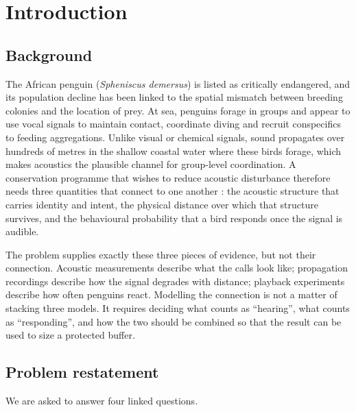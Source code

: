 \section{Introduction}

\subsection{Background}

The African penguin (\textit{Spheniscus demersus}) is listed as critically endangered, and its
population decline has been linked to the spatial mismatch between breeding colonies and the
location of prey. At sea, penguins forage in groups and appear to use vocal signals to maintain
contact, coordinate diving and recruit conspecifics to feeding aggregations. Unlike visual or
chemical signals, sound propagates over hundreds of metres in the shallow coastal water where
these birds forage, which makes acoustics the plausible channel for group-level coordination.
A conservation programme that wishes to reduce acoustic disturbance therefore needs three
quantities that connect to one another \cite{ref1,ref2,ref3}: the acoustic structure that carries identity and
intent, the physical distance over which that structure survives, and the behavioural
probability that a bird responds once the signal is audible.

The problem supplies exactly these three pieces of evidence, but not their connection.
Acoustic measurements describe what the calls look like; propagation recordings describe how
the signal degrades with distance; playback experiments describe how often penguins react.
Modelling the connection is not a matter of stacking three models. It requires deciding what
counts as ``hearing'', what counts as ``responding'', and how the two should be combined so
that the result can be used to size a protected buffer.

\subsection{Problem restatement}

We are asked to answer four linked questions.

